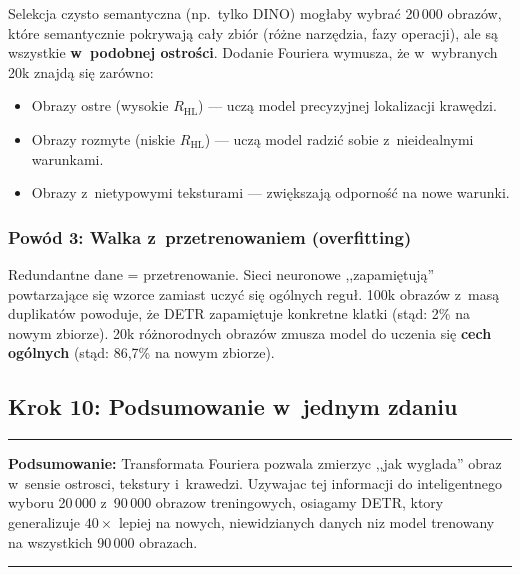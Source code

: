 Selekcja czysto semantyczna (np.\ tylko DINO) mogłaby wybrać 20\,000
obrazów, które semantycznie pokrywają cały zbiór (różne narzędzia, fazy
operacji), ale są wszystkie \textbf{w~podobnej ostrości}.  Dodanie Fouriera
wymusza, że w~wybranych 20k znajdą się zarówno:
\begin{itemize}
    \item Obrazy ostre (wysokie $R_{\text{HL}}$) --- uczą model precyzyjnej
          lokalizacji krawędzi.
    \item Obrazy rozmyte (niskie $R_{\text{HL}}$) --- uczą model radzić
          sobie z~nieidealnymi warunkami.
    \item Obrazy z~nietypowymi teksturami --- zwiększają odporność na nowe
          warunki.
\end{itemize}

\subsubsection{Powód 3: Walka z~przetrenowaniem (overfitting)}

Redundantne dane = przetrenowanie.  Sieci neuronowe ,,zapamiętują''
powtarzające się wzorce zamiast uczyć się ogólnych reguł.  100k obrazów
z~masą duplikatów powoduje, że DETR zapamiętuje konkretne klatki
(stąd: 2\% na nowym zbiorze).  20k różnorodnych obrazów zmusza model do
uczenia się \textbf{cech ogólnych} (stąd: 86{,}7\% na nowym zbiorze).


\subsection{Krok 10: Podsumowanie w~jednym zdaniu}
\label{sec:krok10}

\bigskip
\noindent\rule{\textwidth}{0.4pt}

\noindent\textbf{Podsumowanie:}
Transformata Fouriera pozwala zmierzyc ,,jak wyglada'' obraz
w~sensie ostrosci, tekstury i~krawedzi.  Uzywajac tej informacji do
inteligentnego wyboru 20\,000 z~90\,000 obrazow treningowych, osiagamy
DETR, ktory generalizuje $40\times$ lepiej na nowych, niewidzianych danych
niz model trenowany na wszystkich 90\,000 obrazach.

\noindent\rule{\textwidth}{0.4pt}
\bigskip

\newpage
